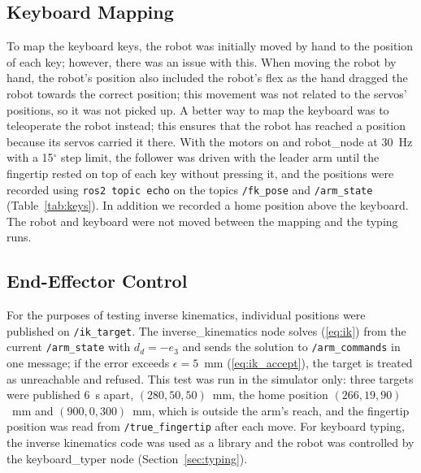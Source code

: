 \documentclass[letterpaper, 10 pt, conference]{ieeeconf}
\begin{document}
\subsection{Keyboard Mapping}
\label{sec:mapping}
To map the keyboard keys, the robot was initially moved by hand to the position of each key; however, there was
an issue with this. When moving the robot by hand, the robot's position also included the robot's flex as the hand
dragged the robot towards the correct position; this movement was not related to the servos' positions, so it was
not picked up. A better way to map the keyboard was to teleoperate the robot instead; this ensures that the robot
has reached a position because its servos carried it there. With the motors on and robot\_node at 30~Hz with a
15$^\circ$ step limit, the follower was driven with the leader arm until the fingertip rested on top of each key
without pressing it, and the positions were recorded using \texttt{ros2 topic echo} on the topics
\texttt{/fk\_pose} and \texttt{/arm\_state} (Table~\ref{tab:keys}). In addition we recorded a home position above
the keyboard. The robot and keyboard were not moved between the mapping and the typing runs.

\subsection{End-Effector Control}
For the purposes of testing inverse kinematics, individual positions were published on \texttt{/ik\_target}. The
inverse\_kinematics node solves (\ref{eq:ik}) from the current \texttt{/arm\_state} with $d_d = -e_3$ and sends the
solution to \texttt{/arm\_commands} in one message; if the error exceeds $\epsilon = 5$~mm
(\ref{eq:ik_accept}), the target is treated as unreachable and refused. This test was run in the simulator only:
three targets were published 6~s apart, $(280, 50, 50)$~mm, the home position $(266, 19, 90)$~mm and
$(900, 0, 300)$~mm, which is outside the arm's reach, and the fingertip position was read from
\texttt{/true\_fingertip} after each move. For keyboard typing, the inverse kinematics code was used as a library
and the robot was controlled by the keyboard\_typer node (Section~\ref{sec:typing}).
\end{document}
